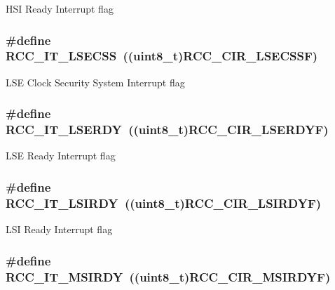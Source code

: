 H\-S\-I Ready Interrupt flag \hypertarget{group___r_c_c___interrupt_gaf3f259914cb56820b1649c9d4413736c}{
\subsubsection[{R\-C\-C\-\_\-\-I\-T\-\_\-\-L\-S\-E\-C\-S\-S}]{\setlength{\rightskip}{0pt plus 5cm}\#define R\-C\-C\-\_\-\-I\-T\-\_\-\-L\-S\-E\-C\-S\-S~((uint8\-\_\-t){\bf R\-C\-C\-\_\-\-C\-I\-R\-\_\-\-L\-S\-E\-C\-S\-S\-F})}}\label{group___r_c_c___interrupt_gaf3f259914cb56820b1649c9d4413736c}
L\-S\-E Clock Security System Interrupt flag \hypertarget{group___r_c_c___interrupt_gad6b6e78a426850f595ef180d292a673d}{
\subsubsection[{R\-C\-C\-\_\-\-I\-T\-\_\-\-L\-S\-E\-R\-D\-Y}]{\setlength{\rightskip}{0pt plus 5cm}\#define R\-C\-C\-\_\-\-I\-T\-\_\-\-L\-S\-E\-R\-D\-Y~((uint8\-\_\-t){\bf R\-C\-C\-\_\-\-C\-I\-R\-\_\-\-L\-S\-E\-R\-D\-Y\-F})}}\label{group___r_c_c___interrupt_gad6b6e78a426850f595ef180d292a673d}
L\-S\-E Ready Interrupt flag \hypertarget{group___r_c_c___interrupt_ga2b4ef277c1b71f96e0bef4b9a72fca94}{
\subsubsection[{R\-C\-C\-\_\-\-I\-T\-\_\-\-L\-S\-I\-R\-D\-Y}]{\setlength{\rightskip}{0pt plus 5cm}\#define R\-C\-C\-\_\-\-I\-T\-\_\-\-L\-S\-I\-R\-D\-Y~((uint8\-\_\-t){\bf R\-C\-C\-\_\-\-C\-I\-R\-\_\-\-L\-S\-I\-R\-D\-Y\-F})}}\label{group___r_c_c___interrupt_ga2b4ef277c1b71f96e0bef4b9a72fca94}
L\-S\-I Ready Interrupt flag \hypertarget{group___r_c_c___interrupt_gae0cfda620ac8949e5b266661dba7ba0a}{
\subsubsection[{R\-C\-C\-\_\-\-I\-T\-\_\-\-M\-S\-I\-R\-D\-Y}]{\setlength{\rightskip}{0pt plus 5cm}\#define R\-C\-C\-\_\-\-I\-T\-\_\-\-M\-S\-I\-R\-D\-Y~((uint8\-\_\-t){\bf R\-C\-C\-\_\-\-C\-I\-R\-\_\-\-M\-S\-I\-R\-D\-Y\-F})}}\label{group___r_c_c___interrupt_gae0cfda620ac8949e5b266661dba7ba0a}

